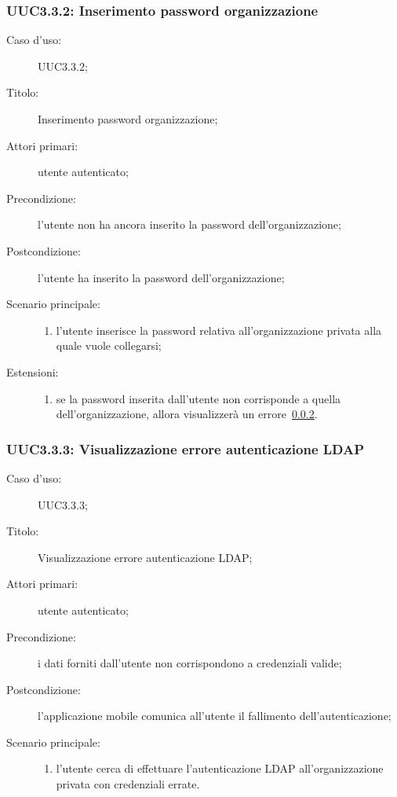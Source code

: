 \documentclass[../../../analisi-dei-requisiti.tex]{subfiles}
\begin{document}
\subsubsection{UUC3.3.2: Inserimento password organizzazione}%
\label{subs:UUC3.3.2}
\begin{description}
  \item[Caso d’uso:] UUC3.3.2;
  \item[Titolo:] Inserimento password organizzazione;
  \item[Attori primari:] utente autenticato;
  \item[Precondizione:] l'utente non ha ancora inserito la password dell'organizzazione;
  \item[Postcondizione:] l'utente ha inserito la password dell'organizzazione;
  \item[Scenario principale:]
        \begin{enumerate}
          \item l'utente inserisce la password relativa all'organizzazione privata alla quale vuole collegarsi;
        \end{enumerate}
  \item[Estensioni:]
        \begin{enumerate}
          \item se la password inserita dall'utente non corrisponde a quella dell'organizzazione, allora visualizzerà un errore~\ref{subs:UUC3.3.3}.
        \end{enumerate}
\end{description}

\subsubsection{UUC3.3.3: Visualizzazione errore autenticazione LDAP}%
\label{subs:UUC3.3.3}
\begin{description}
  \item[Caso d’uso:] UUC3.3.3;
  \item[Titolo:] Visualizzazione errore autenticazione LDAP\@;
  \item[Attori primari:] utente autenticato;
  \item[Precondizione:] i dati forniti dall'utente non corrispondono a credenziali valide;
  \item[Postcondizione:] l'applicazione mobile comunica all'utente il fallimento dell'autenticazione;
  \item[Scenario principale:]
        \begin{enumerate}
          \item l'utente cerca di effettuare l'autenticazione LDAP all'organizzazione privata con credenziali errate.
        \end{enumerate}
\end{description}
\end{document}

